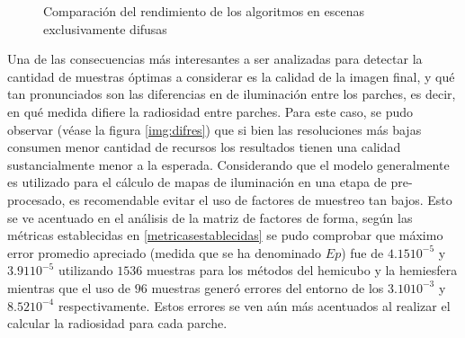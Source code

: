 \begin{figure}
\caption{Comparación del rendimiento de los algoritmos en escenas exclusivamente difusas}
\label{plot:emglc1}
\end{figure}

Una de las consecuencias más interesantes a ser analizadas para detectar la cantidad de muestras óptimas a considerar es la calidad de la imagen final, y qué tan pronunciados son las diferencias en de iluminación entre los parches, es decir, en qué medida difiere la radiosidad entre parches. Para este caso, se pudo observar (véase la figura \ref{img:difres}) que si bien las resoluciones más bajas consumen menor cantidad de recursos los resultados tienen una calidad sustancialmente menor a la esperada. Considerando que el modelo generalmente es utilizado para el cálculo de mapas de iluminación en una etapa de pre-procesado, es recomendable evitar el uso de factores de muestreo tan bajos. Esto se ve acentuado en el análisis de la matriz de factores de forma, según las métricas establecidas en \ref{metricasestablecidas} se pudo comprobar que máximo error promedio apreciado (medida que se ha denominado $Ep$) fue de $4.15 10^{-5}$ y $3.91 10^{-5}$ utilizando $1536$ muestras para los métodos del hemicubo y la hemiesfera mientras que el uso de $96$ muestras generó errores del entorno de los $3.10 10^{-3}$ y $8.52 10^{-4}$ respectivamente. Estos errores se ven aún más acentuados al realizar el calcular la radiosidad para cada parche.

